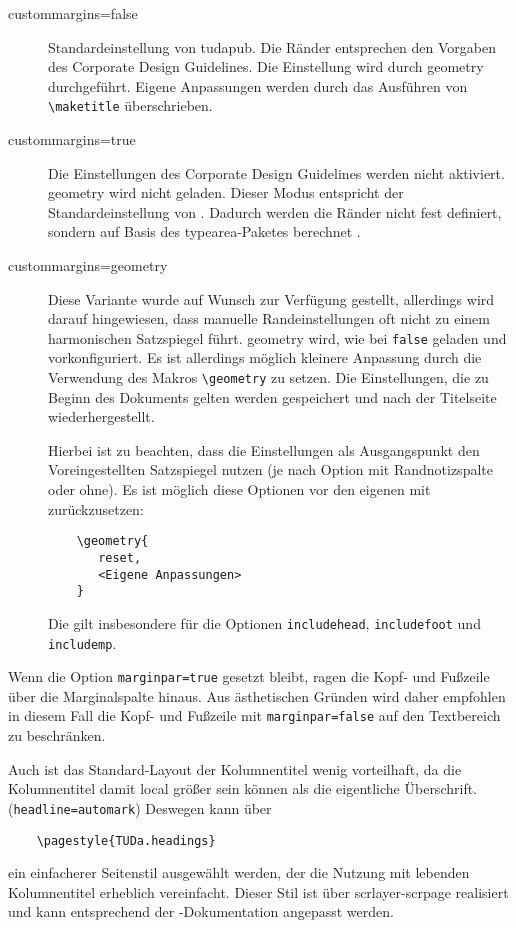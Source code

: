 \documentclass[
	ngerman,
	ruledheaders=section,%
	class=report,%
	thesis={type=bachelor},%
	accentcolor=9c,%
	custommargins=true,%
	marginpar=false,%
	parskip=half-,%
	fontsize=11pt,%
]{tudapub}
\let\code\texttt
\let\pck\textsf
\let\cls\textsf
\begin{document}
\begin{description}
\item[custommargins=false] Standardeinstellung von \cls{tudapub}. Die Ränder entsprechen den Vorgaben des Corporate Design Guidelines. Die Einstellung wird durch \pck{geometry} durchgeführt. Eigene Anpassungen werden durch das Ausführen von \code{\textbackslash{}maketitle} überschrieben.
\item[custommargins=true] Die Einstellungen des Corporate Design Guidelines werden nicht aktiviert. \pck{geometry} wird nicht geladen. Dieser Modus entspricht der Standardeinstellung von \KOMAScript{}. Dadurch werden die Ränder nicht fest definiert, sondern auf Basis des \pck{typearea}-Paketes berechnet \cite[vgl.][]{scrguide}.
\item[custommargins=geometry]  Diese Variante wurde auf Wunsch zur Verfügung gestellt, allerdings wird darauf hingewiesen, dass manuelle Randeinstellungen oft nicht zu einem harmonischen Satzspiegel führt.
\pck{geometry} wird, wie bei \code{false} geladen und vorkonfiguriert. Es ist allerdings möglich kleinere Anpassung durch die Verwendung des Makros \code{\textbackslash{}geometry} zu setzen. Die Einstellungen, die zu Beginn des Dokuments gelten werden gespeichert und nach der Titelseite wiederhergestellt.

Hierbei ist zu beachten, dass die Einstellungen als Ausgangspunkt den Voreingestellten Satzspiegel nutzen (je nach Option mit Randnotizspalte oder ohne). Es ist möglich diese Optionen vor den eigenen mit zurückzusetzen:
\begin{verbatim}
	\geometry{
	   reset,
	   <Eigene Anpassungen>
	}
\end{verbatim}
Die gilt insbesondere für die Optionen \code{includehead}, \code{includefoot} und \code{includemp}.
\end{description}


Wenn die Option \code{marginpar=true} gesetzt bleibt, ragen die Kopf- und Fußzeile über die Marginalspalte hinaus. Aus ästhetischen Gründen wird daher empfohlen in diesem Fall die Kopf- und Fußzeile  mit \code{marginpar=false}  auf den Textbereich zu beschränken.

Auch ist das Standard-Layout der Kolumnentitel wenig vorteilhaft, da die Kolumnentitel damit local größer sein können als die eigentliche Überschrift. (\code{headline=automark})
Deswegen kann über
\begin{verbatim}
	\pagestyle{TUDa.headings}
\end{verbatim}
ein einfacherer Seitenstil ausgewählt werden, der die Nutzung mit lebenden Kolumnentitel erheblich vereinfacht. Dieser Stil ist über \pck{scrlayer-scrpage} realisiert und kann entsprechend der \KOMAScript{}-Dokumentation angepasst werden.
\end{document}
